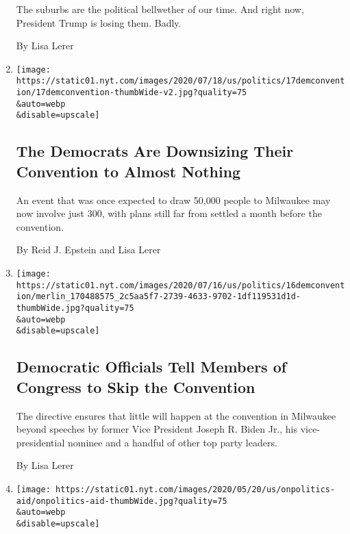 \begin{enumerate}
  The suburbs are the political bellwether of our time. And right now,
  President Trump is losing them. Badly.

  By Lisa Lerer
\item
  \href{/2020/07/17/us/politics/democratic-convention-milwaukee.html}{}

  \texttt{[image: https://static01.nyt.com/images/2020/07/18/us/politics/17demconvention/17demconvention-thumbWide-v2.jpg?quality=75\\\&auto=webp\\\&disable=upscale]}

  \hypertarget{the-democrats-are-downsizing-their-convention-to-almost-nothing}{%
  \subsection{The Democrats Are Downsizing Their Convention to Almost
  Nothing}\label{the-democrats-are-downsizing-their-convention-to-almost-nothing}}

  An event that was once expected to draw 50,000 people to Milwaukee may
  now involve just 300, with plans still far from settled a month before
  the convention.

  By Reid J. Epstein and Lisa Lerer
\item
  \href{/2020/07/16/us/politics/democratic-convention-milwaukee.html}{}

  \texttt{[image: https://static01.nyt.com/images/2020/07/16/us/politics/16demconvention/merlin\_170488575\_2c5aa5f7-2739-4633-9702-1df119531d1d-thumbWide.jpg?quality=75\\\&auto=webp\\\&disable=upscale]}

  \hypertarget{democratic-officials-tell-members-of-congress-to-skip-the-convention}{%
  \subsection{Democratic Officials Tell Members of Congress to Skip the
  Convention}\label{democratic-officials-tell-members-of-congress-to-skip-the-convention}}

  The directive ensures that little will happen at the convention in
  Milwaukee beyond speeches by former Vice President Joseph R. Biden
  Jr., his vice-presidential nominee and a handful of other top party
  leaders.

  By Lisa Lerer
\item
  \href{/2020/07/16/us/politics/reopening-schools-teachers-students.html}{}

  \texttt{[image: https://static01.nyt.com/images/2020/05/20/us/onpolitics-aid/onpolitics-aid-thumbWide.jpg?quality=75\\\&auto=webp\\\&disable=upscale]}


\end{enumerate}
